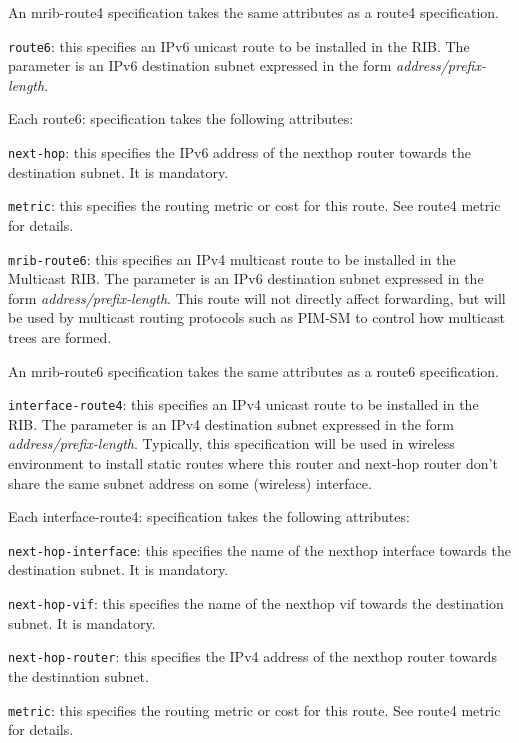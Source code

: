 \begin{description}
  An {\stt mrib-route4} specification takes the same attributes as a
  {\stt route4} specification.
\item{\tt route6}: this specifies an IPv6 unicast route to be
  installed in the RIB.  The parameter is an IPv6 destination subnet
  expressed in the form {\it address/prefix-length}.

  Each {\stt route6}: specification takes the following attributes:
\begin{description}
\item{\tt next-hop}: this specifies the IPv6 address of the nexthop
  router towards the destination subnet. It is mandatory.
\item{\tt metric}: this specifies the routing metric or cost for this
  route.  See {\stt route4 metric} for details.
\end{description}
\item{\tt mrib-route6}: this specifies an IPv4 multicast route to be
  installed in the Multicast RIB.  The parameter is an IPv6
  destination subnet expressed in the form {\it
  address/prefix-length}.  This route will not directly affect
  forwarding, but will be used by multicast routing protocols such as
  PIM-SM to control how multicast trees are formed.

  An {\stt mrib-route6} specification takes the same attributes as a
  {\stt route6} specification.

\item{\tt interface-route4}: this specifies an IPv4 unicast route to be
  installed in the RIB.  The parameter is an IPv4 destination subnet
  expressed in the form {\it address/prefix-length}. Typically, this
  specification will be used in wireless environment to install
  static routes where this router and next-hop router don't share the same
  subnet address on some (wireless) interface.

  Each {\stt interface-route4}: specification takes the following attributes:
\begin{description}
\item{\tt next-hop-interface}: this specifies the name of the nexthop
  interface towards the destination subnet. It is mandatory.
\item{\tt next-hop-vif}: this specifies the name of the nexthop
  vif towards the destination subnet. It is mandatory.
\item{\tt next-hop-router}: this specifies the IPv4 address of the nexthop
  router towards the destination subnet.
\item{\tt metric}: this specifies the routing metric or cost for this
  route.  See {\stt route4 metric} for details.
\end{description}

\end{description}

